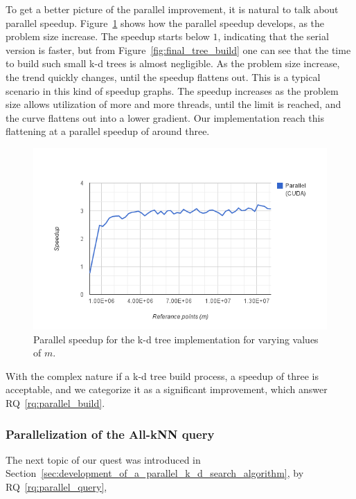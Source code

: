 To get a better picture of the parallel improvement, it is natural to talk about parallel speedup. Figure~\ref{fig:final_tree_build_speedup} shows how the parallel speedup develops, as the problem size increase. The speedup starts below $1$, indicating that the serial version is faster, but from Figure~\ref{fig:final_tree_build} one can see that the time to build such small k-d trees is almost negligible. As the problem size increase, the trend quickly changes, until the speedup flattens out. This is a typical scenario in this kind of speedup graphs. The speedup increases as the problem size allows utilization of more and more threads, until the limit is reached, and the curve flattens out into a lower gradient. Our implementation reach this flattening at a parallel speedup of around three.      

\begin{figure}[ht!]
    \centering
    \includegraphics[width=120mm]{../gfx/final_tree_build_speedup.png}
    \caption{Parallel speedup for the k-d tree implementation for varying values of $m$.}
    \label{fig:final_tree_build_speedup}
\end{figure}

With the complex nature if a k-d tree build process, a speedup of three is acceptable, and we categorize it as a significant improvement, which answer RQ~\ref{rq:parallel_build}. 

\subsubsection{Parallelization of the All-kNN query} %
\label{ssub:parallelization_of_the_all_knn_query}

The next topic of our quest was introduced in Section~\ref{sec:development_of_a_parallel_k_d_search_algorithm}, by RQ~\ref{rq:parallel_query},

